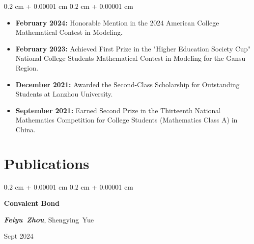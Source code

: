 \documentclass[10pt, letterpaper]{article}
\newenvironment{highlightsforbulletentries}{
    \begin{itemize}[
        topsep=0.10 cm,
        parsep=0.10 cm,
        partopsep=0pt,
        itemsep=0pt,
        leftmargin=10pt
    ]
}{
    \end{itemize}
} %
\newenvironment{onecolentry}{
    \begin{adjustwidth}{
        0.2 cm + 0.00001 cm
    }{
        0.2 cm + 0.00001 cm
    }
}{
    \end{adjustwidth}
} %
\newenvironment{twocolentry}[2][]{
    \onecolentry
    \def\secondColumn{#2}
    \setcolumnwidth{\fill, 6.5 cm}
    \begin{paracol}{2}
}{
    \switchcolumn \raggedleft \secondColumn
    \end{paracol}
    \endonecolentry
} %
\let\hrefWithoutArrow\href
\renewcommand{\href}[2]{\hrefWithoutArrow{#1}{\ifthenelse{\equal{#2}{}}{ }{#2 }\raisebox{.15ex}{\footnotesize \faExternalLink*}}}
\begin{document}
    \begin{onecolentry}
        \begin{highlightsforbulletentries}

        \item \textbf{February 2024:} Honorable Mention in the 2024 American College Mathematical Contest in Modeling.

        \item \textbf{February 2023:} Achieved First Prize in the "Higher Education Society Cup" National College Students Mathematical Contest in Modeling for the Gansu Region.

        \item \textbf{December 2021:} Awarded the Second-Class Scholarship for Outstanding Students at Lanzhou University.

        \item \textbf{September 2021:} Earned Second Prize in the Thirteenth National Mathematics Competition for College Students (Mathematics Class A) in China.

        \end{highlightsforbulletentries}
    \end{onecolentry}



    
    \section{Publications}

        \begin{samepage}
            \begin{twocolentry}{
                Sept 2024
            }
                \textbf{Convalent Bond}

                \vspace{0.10 cm}

                \mbox{\textbf{\textit{Feiyu Zhou}}}, \mbox{Shengying Yue}
            \end{twocolentry}
            \vspace{0.10 cm}

        \end{samepage}


\end{document}
